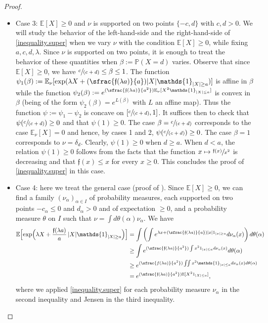 \documentclass[JEP,XML,SOM,Unicode,published]{cedram}
\newcommand\mto{\mathchoice{\longmapsto}{\mapsto}{\mapsto}{\mapsto}}
\newcommand{\spfrac}[2]{\sfrac{#1}{(#2)}}
\newcommand{\Psfrac}[2]{(\sfrac{#1}{#2})}
\theoremstyle{plain}
\theoremstyle{definition}
\newcommand\E{\mathbb{E}}
\newcommand\p{\mathbb{P}}
\begin{document}
\begin{proof}
\begin{itemize}
\item Case 3: $\E[X]\geq 0$ and $\nu$ is supported on two points $\{-c,d\}$ with $c,d>0$. We will study the behavior of the left-hand-side and the right-hand-side of \eqref{inequality.super} when we vary $\nu$ with the condition $\E[X]\geq 0$, while fixing $a,c,d,\lambda$. Since $\nu$ is supported on two points, it is enough to treat the behavior of these quantities when
$\beta:=\p(X=d)$ varies. Observe that since $\E[X]\geq 0$, we have $ \spfrac{c}{c+d}\leq \beta \leq 1$. The function
$\psi_1(\beta):=\E_{\nu}[\exp(\lambda X + \Psfrac{\mathfrak{f}(\lambda a)}{a} |X| \mathds{1}_{|X|\geq a})]$ is affine in $\beta$ while the function $\psi_2(\beta):= e^{\Psfrac{\mathfrak{f}(\lambda a)}{a^2} \E_{\nu}[X^2 \mathds{1}_{|X| \leq a}]}$ is convex in $\beta$ (being of the form $\psi_2(\beta)=e^{L(\beta)}$ with $L$ an affine map). Thus the function $\psi:=\psi_1-\psi_2$ is concave on $[\spfrac{c}{c+d}, 1]$. It suffices then to check that $\psi(\spfrac{c}{c+d})\geq 0$ and that $\psi(1)\geq 0$. The case $\beta=\spfrac{c}{c+d}$ corresponds to the case $\E_{\nu}[X]=0$ and hence, by cases 1 and 2, $\psi(\spfrac{c}{c+d})\geq 0$.
The case $\beta=1$ corresponds to $\nu=\delta_d$. Clearly, $\psi(1)\geq 0$ when $d\geq a$. When $d<a$, the relation $\psi(1)\geq 0$ follows from the facts that the function $x\mto \sfrac{\mathfrak{f}(x)}{x^2}$ is decreasing and that $\mathfrak{f}(x)\leq x$ for every $x\geq 0$. This concludes the proof of \eqref{inequality.super} in this case.

\item Case 4: here we treat the general case (\cf proof of \cite[Prop.\,3.6]{Freedman}). Since $\E[X]\geq 0$, we can find a family $(\nu_{\alpha})_{\alpha \in I}$ of probability measures, each supported on two points $-c_{\alpha}\leq 0$ and $d_{\alpha}>0$ and of expectation $\geq 0$, and a probability measure $\theta$ on $I$ such that $\nu=\int{d\theta(\alpha) \nu_{\alpha}}$. We have
\begin{equation*}
\begin{aligned}
\E\Bigl[\exp\Bigl(\lambda X + \frac{\mathfrak{f}(\lambda a)}{a}\, |X| \mathds{1}_{|X|\geq a}\Bigr)\Bigr]&=\int
\left(\int e^{\lambda x +\Psfrac{\mathfrak{f}(\lambda a)}{a}|x| 1_{|x| \geq a}}d\nu_\alpha(x)\right)d\theta(\alpha) \\
&\geq \int e^{\Psfrac{\mathfrak{f}(\lambda a)}{a^2} \int x^2 1_{|x| \leq a} d\nu_\alpha(x)}d\theta(\alpha) \\
& \geq e^{\Psfrac{f(\lambda a)}{a^2} \iint{x^2 \mathds{1}_{|x|\leq a} d\nu_{\alpha}(x) d\theta(\alpha)}}\\
&= e^{\Psfrac{\mathfrak{f}(\lambda a)}{a^2} \mathbb{E}[X^2 1_{|X| \leq a}]},
\end{aligned}
\end{equation*}
where we applied \eqref{inequality.super} for each probability measure $\nu_{\alpha}$ in the second inequality and Jensen in the third inequality.\qedhere
\end{itemize}
\end{proof}
\end{document}
